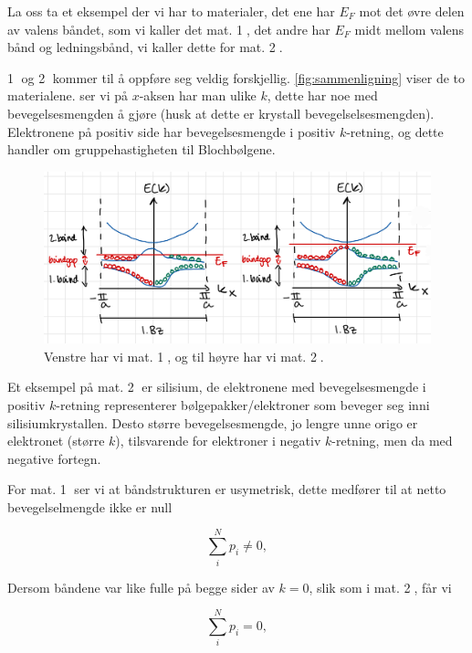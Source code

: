 La oss ta et eksempel der vi har to materialer, det ene har $E_F$ mot det øvre delen av valens båndet, som vi kaller det mat. \textcircled{1}, det andre har $E_F$ midt mellom valens bånd og ledningsbånd, vi kaller dette for mat. \textcircled{2}.

\textcircled{1} og \textcircled{2} kommer til å oppføre seg veldig forskjellig. \autoref{fig:sammenligning} viser de to materialene. ser vi på $x$-aksen har man ulike $k$, dette har noe med bevegelsesmengden å gjøre (husk at dette er krystall bevegelselsesmengden). Elektronene på positiv side har bevegelsesmengde i positiv $k$-retning, og dette handler om gruppehastigheten til Blochbølgene.

\begin{figure}[!htb]
    \centering
    \includegraphics[scale=0.2]{Bilder/SamtaleTema6/sammenligning.jpeg}
    \caption{Venstre har vi mat. \textcircled{1}, og til høyre har vi mat. \textcircled{2}.}
    \label{fig:sammenligning}
\end{figure}

Et eksempel på mat. \textcircled{2} er silisium, de elektronene med bevegelsesmengde i positiv $k$-retning representerer bølgepakker/elektroner som beveger seg inni silisiumkrystallen. Desto større bevegelsesmengde, jo lengre unne origo er elektronet (større $k$), tilsvarende for elektroner i negativ $k$-retning, men da med negative fortegn.

\newpage
For mat. \textcircled{1} ser vi at båndstrukturen er usymetrisk, dette medfører til at netto bevegelselmengde ikke er null

\begin{equation*}
    \sum_i^N p_i \neq 0, 
\end{equation*}

Dersom båndene var like fulle på begge sider av $k=0$, slik som i mat. \textcircled{2}, får vi 

\begin{equation*}
    \sum_i^N p_i = 0, 
\end{equation*}

